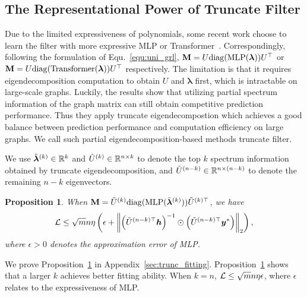 \documentclass{article} %
\def\vlambda{{\bm\lambda}}
\newtheorem{proposition}{\textbf{Proposition}} %
\begin{document}
\subsection{The Representational Power of Truncate Filter}

Due to the limited expressiveness of polynomials, some recent work choose to learn the filter with more expressive MLP or Transformer~\citep{lingam2022piece,yang2022spectrum,bo2022specformer}.
Correspondingly, following the formulation of Equ.~\ref{equ:uni_grl}, $\rmM=U\mathrm{diag}(\mathrm{MLP}(\vlambda))U^{\top}$ or $\rmM=U\mathrm{diag}(\mathrm{Transformer}(\vlambda))U^{\top}$ respectively.
The limitation is that it requires eigendecomposition computation to obtain $U$ and $\vlambda$ first, which is intractable on large-scale graphs.
Luckily, the results show that utilizing partial spectrum information of the graph matrix can still obtain competitive prediction performance.
Thus they apply truncate eigendecompostion which achieves a good balance between prediction performance and computation efficiency on large graphs.
We call such partial eigendecomposition-based methods truncate filter.

We use $\tilde\vlambda^{(k)}\in\sR^k$ and $\tilde U^{(k)}\in{\mathbb{R}}^{n\times k}$ to denote the top $k$ spectrum information obtained by truncate eigendecomposition, and $\tilde U^{(n-k)}\in{\mathbb{R}}^{n\times(n-k)}$ to denote the remaining $n-k$ eigenvectors.
\begin{proposition}
	\label{prop:trunc_fitting}
	When $\rmM=\tilde U^{(k)}\mathrm{diag}(\mathrm{MLP}(\tilde\vlambda^{(k)}))\tilde U^{(k)\top}$, we have
	\begin{equation}
		\label{equ:bound_trunc}
		\begin{aligned}
			{\mathcal{L}}\leq\sqrt{m}n\eta\left(\epsilon+\left\|\left(\tilde U^{(n-k)\top}{\bm{h}}\right)^{-1}\odot\left(\tilde U^{(n-k)\top}{\bm{y}}^*\right)\right\|_2\right),
		\end{aligned}
	\end{equation}
	where $\epsilon>0$ denotes the approximation error of MLP.
\end{proposition}
We prove Proposition~\ref{prop:trunc_fitting} in Appendix~\ref{sec:trunc_fitting}.
Proposition~\ref{prop:trunc_fitting} shows that a larger $k$ achieves better fitting ability.
When $k=n$, ${\mathcal{L}}\leq\sqrt{m}n\eta\epsilon$, where $\epsilon$ relates to the expressiveness of MLP.
\end{document}

